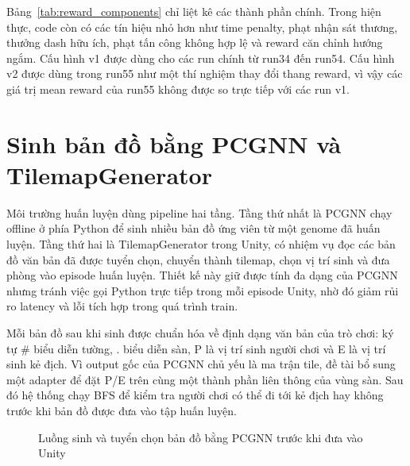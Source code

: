Bảng~\ref{tab:reward_components} chỉ liệt kê các thành phần chính. Trong hiện thực, code còn có các tín hiệu nhỏ hơn như time penalty, phạt nhận sát thương, thưởng dash hữu ích, phạt tấn công không hợp lệ và reward căn chỉnh hướng ngắm. Cấu hình v1 được dùng cho các run chính từ run34 đến run54. Cấu hình v2 được dùng trong run55 như một thí nghiệm thay đổi thang reward, vì vậy các giá trị mean reward của run55 không được so trực tiếp với các run v1.

\section{Sinh bản đồ bằng PCGNN và TilemapGenerator}

Môi trường huấn luyện dùng pipeline hai tầng. Tầng thứ nhất là PCGNN chạy offline ở phía Python để sinh nhiều bản đồ ứng viên từ một genome đã huấn luyện. Tầng thứ hai là TilemapGenerator trong Unity, có nhiệm vụ đọc các bản đồ văn bản đã được tuyển chọn, chuyển thành tilemap, chọn vị trí sinh và đưa phòng vào episode huấn luyện. Thiết kế này giữ được tính đa dạng của PCGNN nhưng tránh việc gọi Python trực tiếp trong mỗi episode Unity, nhờ đó giảm rủi ro latency và lỗi tích hợp trong quá trình train.

Mỗi bản đồ sau khi sinh được chuẩn hóa về định dạng văn bản của trò chơi: ký tự \# biểu diễn tường, . biểu diễn sàn, P là vị trí sinh người chơi và E là vị trí sinh kẻ địch. Vì output gốc của PCGNN chủ yếu là ma trận tile, đề tài bổ sung một adapter để đặt P/E trên cùng một thành phần liên thông của vùng sàn. Sau đó hệ thống chạy BFS để kiểm tra người chơi có thể đi tới kẻ địch hay không trước khi bản đồ được đưa vào tập huấn luyện.

\begin{figure}[H]
    \centering
    \caption{Luồng sinh và tuyển chọn bản đồ bằng PCGNN trước khi đưa vào Unity}
    \label{fig:map_generation_workflow}
\end{figure}

